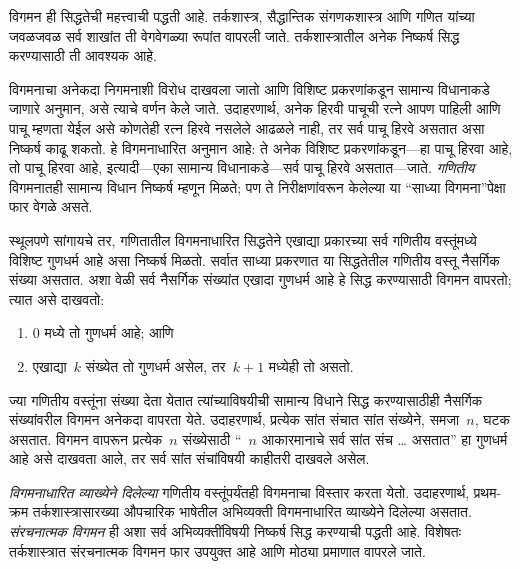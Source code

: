 \documentclass[../../../include/open-logic-section]{subfiles}
\begin{document}


विगमन ही सिद्धतेची महत्त्वाची पद्धती आहे. तर्कशास्त्र, सैद्धान्तिक संगणकशास्त्र आणि गणित यांच्या जवळजवळ सर्व शाखांत ती वेगवेगळ्या रूपांत वापरली जाते. तर्कशास्त्रातील अनेक निष्कर्ष सिद्ध करण्यासाठी ती आवश्यक आहे.

विगमनाचा अनेकदा निगमनाशी विरोध दाखवला जातो आणि विशिष्ट प्रकरणांकडून सामान्य विधानाकडे जाणारे अनुमान, असे त्याचे वर्णन केले जाते. उदाहरणार्थ, अनेक हिरवी पाचूची रत्ने आपण पाहिली आणि पाचू म्हणता येईल असे कोणतेही रत्न हिरवे नसलेले आढळले नाही, तर सर्व पाचू हिरवे असतात असा निष्कर्ष काढू शकतो. हे विगमनाधारित अनुमान आहे: ते अनेक विशिष्ट प्रकरणांकडून---हा पाचू हिरवा आहे, तो पाचू हिरवा आहे, इत्यादी---एका सामान्य विधानाकडे---सर्व पाचू हिरवे असतात---जाते. \emph{गणितीय} विगमनातही सामान्य विधान निष्कर्ष म्हणून मिळते; पण ते निरीक्षणांवरून केलेल्या या “साध्या विगमना”पेक्षा फार वेगळे असते.

स्थूलपणे सांगायचे तर, गणितातील विगमनाधारित सिद्धतेने एखाद्या प्रकारच्या सर्व गणितीय वस्तूंमध्ये विशिष्ट गुणधर्म आहे असा निष्कर्ष मिळतो. सर्वात साध्या प्रकरणात या सिद्धतेतील गणितीय वस्तू नैसर्गिक संख्या असतात. अशा वेळी सर्व नैसर्गिक संख्यांत एखादा गुणधर्म आहे हे सिद्ध करण्यासाठी विगमन वापरतो; त्यात असे दाखवतो:
\begin{enumerate}
\item $0$ मध्ये तो गुणधर्म आहे; आणि
\item एखाद्या~$k$ संख्येत तो गुणधर्म असेल, तर~$k+1$ मध्येही तो असतो.
\end{enumerate}
ज्या गणितीय वस्तूंना संख्या देता येतात त्यांच्याविषयीची सामान्य विधाने सिद्ध करण्यासाठीही नैसर्गिक संख्यांवरील विगमन अनेकदा वापरता येते. उदाहरणार्थ, प्रत्येक सांत संचात सांत संख्येने, समजा~$n$, घटक असतात. विगमन वापरून प्रत्येक~$n$ संख्येसाठी “~$n$ आकारमानाचे सर्व सांत संच \dots{} असतात” हा गुणधर्म आहे असे दाखवता आले, तर सर्व सांत संचांविषयी काहीतरी दाखवले असेल.

\emph{विगमनाधारित व्याख्येने दिलेल्या} गणितीय वस्तूंपर्यंतही विगमनाचा विस्तार करता येतो. उदाहरणार्थ, प्रथम-क्रम तर्कशास्त्रासारख्या औपचारिक भाषेतील अभिव्यक्ती विगमनाधारित व्याख्येने दिलेल्या असतात. \emph{संरचनात्मक विगमन} ही अशा सर्व अभिव्यक्तींविषयी निष्कर्ष सिद्ध करण्याची पद्धती आहे. विशेषतः तर्कशास्त्रात संरचनात्मक विगमन फार उपयुक्त आहे आणि मोठ्या प्रमाणात वापरले जाते.
\end{document}

